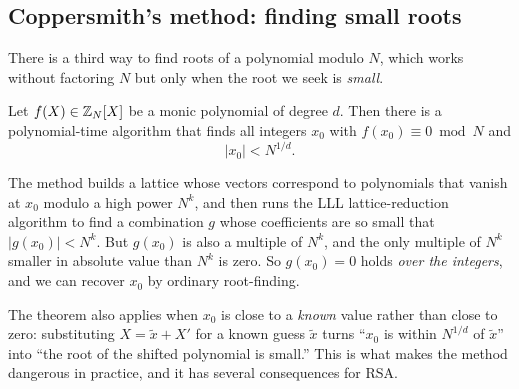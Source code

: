 \subsection{Coppersmith's method: finding small roots}
\label{sec:coppersmith}
There is a third way to find roots of a polynomial modulo $N$, which
works without factoring $N$ but only when the root we seek is
\emph{small}.\autocite{Coppersmith97}

\begin{theorem}[Coppersmith]\label{thm:coppersmith}
  Let $f(X) \in \mathbb{Z}_N[X]$ be a monic polynomial of degree $d$.  Then
  there is a polynomial-time algorithm that finds all integers $x_0$
  with $f(x_0) \equiv 0 \bmod N$ and
  \[ |x_0| < N^{1/d}. \]
\end{theorem}

The method builds a lattice whose vectors correspond to polynomials
that vanish at $x_0$ modulo a high power $N^k$, and then runs the LLL
lattice-reduction algorithm\autocite{LLL82} to find a combination $g$
whose coefficients are so small that $|g(x_0)| < N^k$.  But $g(x_0)$ is
also a multiple of $N^k$, and the only multiple of $N^k$ smaller in
absolute value than $N^k$ is zero.  So $g(x_0) = 0$ holds
\emph{over the integers}, and we can recover $x_0$ by ordinary
root-finding.

The theorem also applies when $x_0$ is close to a \emph{known} value
rather than close to zero: substituting $X = \tilde{x} + X'$ for a
known guess $\tilde x$ turns ``$x_0$ is within $N^{1/d}$ of
$\tilde x$'' into ``the root of the shifted polynomial is small.''
This is what makes the method dangerous in practice, and it has
several consequences for RSA.

